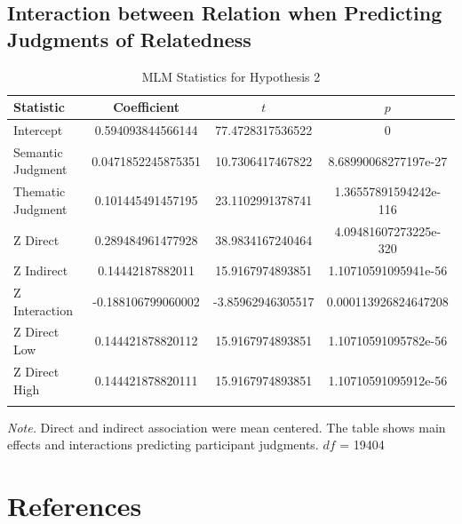 \documentclass[english,,man]{apa6}
\begin{document}
\hypertarget{interaction-between-relation-when-predicting-judgments-of-relatedness}{%
\subsection{Interaction between Relation when Predicting Judgments of Relatedness}\label{interaction-between-relation-when-predicting-judgments-of-relatedness}}

\begin{table}[tbp]
\begin{center}
\begin{threeparttable}
\caption{\label{tab:hyp2-table}MLM Statistics for Hypothesis 2}
\begin{tabular}{lccc}
\toprule
Statistic & \multicolumn{1}{c}{Coefficient} & \multicolumn{1}{c}{$t$} & \multicolumn{1}{c}{$p$}\\
\midrule
Intercept & 0.594093844566144 & 77.4728317536522 & 0\\
Semantic Judgment & 0.0471852245875351 & 10.7306417467822 & 8.68990068277197e-27\\
Thematic Judgment & 0.101445491457195 & 23.1102991378741 & 1.36557891594242e-116\\
Z Direct & 0.289484961477928 & 38.9834167240464 & 4.09481607273225e-320\\
Z Indirect & 0.14442187882011 & 15.9167974893851 & 1.10710591095941e-56\\
Z Interaction & -0.188106799060002 & -3.85962946305517 & 0.000113926824647208\\
Z Direct Low & 0.144421878820112 & 15.9167974893851 & 1.10710591095782e-56\\
Z Direct High & 0.144421878820111 & 15.9167974893851 & 1.10710591095912e-56\\
\bottomrule
\addlinespace
\end{tabular}
\begin{tablenotes}[para]
\normalsize{\textit{Note.} Direct and indirect association  were mean centered. The table shows main effects and interactions predicting participant judgments. $df$ = 19404}
\end{tablenotes}
\end{threeparttable}
\end{center}
\end{table}

\newpage

\hypertarget{references}{%
\section{References}\label{references}}
\end{document}
